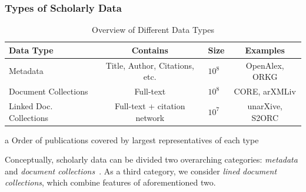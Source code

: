 \subsubsection{Types of Scholarly Data}

\begin{table}[tb]
  \caption{Overview of Different Data Types}
  \label{tab:data_types}
  \centering
  \begin{small}
    \begin{threeparttable}
      \begin{tabular}{lclc}
        \toprule
        Data Type                  & Contains                             & Size\tnote{a} & Examples \\
        \midrule
        Metadata                   & Title, Author, Citations, etc.       & \(10^8\)              & OpenAlex, ORKG \\
        Document Collections       & Full-text                            & \(10^8\)              & CORE, arXMLiv \\
        Linked Doc. Collections    & Full-text + citation network         & \(10^7\)              & unarXive, S2ORC \\
        \bottomrule
      \end{tabular}
      \begin{tablenotes}
        \item[a] Order of publications covered by largest representatives of each type
      \end{tablenotes}
    \end{threeparttable}
  \end{small}
\end{table}

Conceptually, scholarly data can be divided two overarching categories: \emph{metadata} and \emph{document collections}~\cite{Nasar2018}. As a third category, we consider \emph{lined document collections}, which combine features of aforementioned two.


